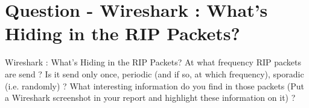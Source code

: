 \section{Question - Wireshark : What's Hiding in the RIP Packets?}

\begin{questionBox}{Wireshark : What's Hiding in the RIP Packets?}
    At what frequency RIP packets are send ? Is it send only once, periodic (and if so, at which frequency), sporadic (i.e. randomly) ? 
    What interesting information do you find in those packets (Put a Wireshark screenshot in your report and highlight these information on it) ?
\end{questionBox}

